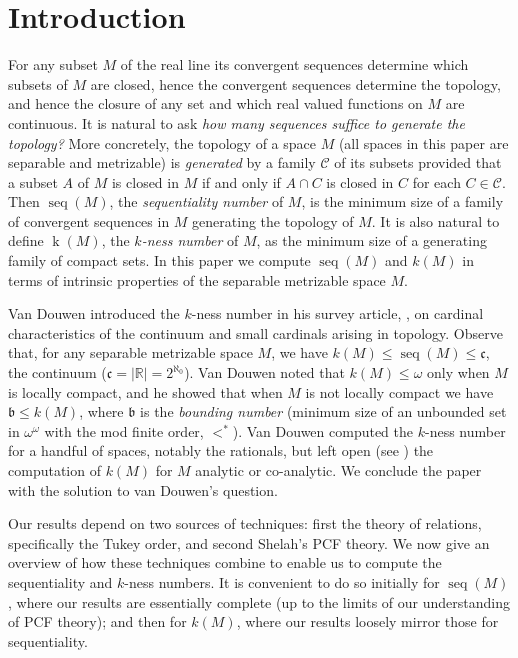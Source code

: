 \documentclass{article}
\begin{document}
\section{Introduction}
For any subset $M$ of the real line its convergent sequences determine which subsets of $M$ are closed,   hence the convergent sequences determine the topology, and hence the closure of any set and which real valued functions on $M$ are continuous. It is natural to ask \emph{how many sequences suffice to generate the topology?}  
More concretely, the topology of a space $M$ (all spaces in this paper are separable and metrizable)   is \emph{generated} by a family $\mathcal{C}$ of its subsets provided that a subset $A$ of $M$ is closed in $M$ if and only if $A\cap C$ is closed in $C$ for each $C\in \mathcal{C}$. Then $\mathop{seq}(M)$, the \emph{sequentiality number} of $M$, is the minimum size of a family of convergent sequences in $M$ generating the topology of $M$. 
It is also natural to define  $\mathop{k}(M)$, the \emph{$k$-ness number} of $M$, as the minimum size of a generating family  of compact sets. In this paper we compute $\mathop{seq}(M)$ and $k(M)$ in terms of intrinsic properties of the separable metrizable space $M$.

Van Douwen introduced the $k$-ness number  
in his survey article, \cite{vanDou}, on cardinal characteristics of the continuum and small cardinals arising in topology. Observe that, for any separable metrizable space  $M$, we have $k(M) \le \mathop{seq}(M) \le \mathfrak{c}$, the continuum ($\mathfrak{c}=|\mathbb{R}|=2^{\aleph_0}$). Van Douwen noted that $k(M) \le \omega$ only when $M$ is locally compact, and he showed that when  $M$ is not locally compact we have $\mathfrak{b} \le k(M)$, where $\mathfrak{b}$ is the \emph{bounding number} (minimum size of an unbounded set in $\omega^\omega$ with the mod finite order, $<^*$). 
Van Douwen computed the $k$-ness number for a handful of spaces, notably the rationals, but left open (see \cite[Question~8.11]{vanDou}) the computation of $k(M)$ for $M$ analytic or co-analytic. We conclude the paper with the solution to van Douwen's question. 

Our results depend on two sources of techniques: first the theory of relations, specifically the Tukey order,   and second Shelah's \textsc{PCF}  theory. 
We now give an overview of how these techniques combine to enable us to compute the sequentiality and $k$-ness numbers. It is convenient to do so initially for $\mathop{seq}(M)$, where our results are essentially complete (up to the limits of our understanding of \textsc{PCF} theory); and then for $k(M)$, where our results loosely mirror those for sequentiality.
\end{document}
